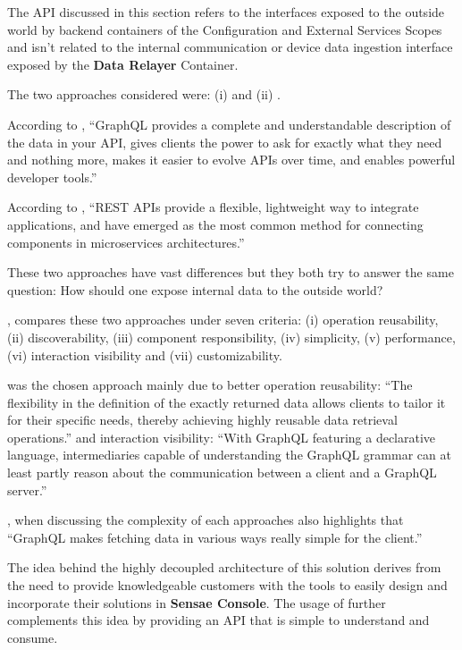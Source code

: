 The \gls{API} discussed in this section refers to the interfaces exposed to the outside world by backend containers of the Configuration and External Services Scopes and isn't related to the internal communication or device data ingestion interface exposed by the \textbf{Data Relayer} Container.

The two approaches considered were: (i)  and (ii) .

According to \cite{graphql}, ``GraphQL provides a complete and understandable description of the data in your API, gives clients the power to ask for exactly what they need and nothing more, makes it easier to evolve APIs over time, and enables powerful developer tools.''

According to \cite{rest}, ``REST APIs provide a flexible, lightweight way to integrate applications, and have emerged as the most common method for connecting components in microservices architectures.''

These two approaches have vast differences but they both try to answer the same question: How should one expose internal data to the outside world?

\cite{eizinger2017api}, compares these two approaches under seven criteria: (i) operation reusability, (ii) discoverability, (iii) component responsibility, (iv) simplicity, (v) performance, (vi) interaction visibility and (vii) customizability.

 was the chosen approach mainly due to better operation reusability: ``The flexibility in the definition of the exactly returned data allows clients to tailor it for their specific needs, thereby achieving highly reusable data retrieval operations.'' and interaction visibility: ``With GraphQL featuring a declarative language, intermediaries capable of understanding the GraphQL grammar can at least partly reason about the communication between a client and a GraphQL server.''

\cite{eizinger2017api}, when discussing the complexity of each approaches also highlights that ``GraphQL makes fetching data in various ways really simple for the client.''

The idea behind the highly decoupled architecture of this solution derives from the need to provide knowledgeable customers with the tools to easily design and incorporate their solutions in \textbf{Sensae Console}. The usage of  further complements this idea by providing an API that is simple to understand and consume.

